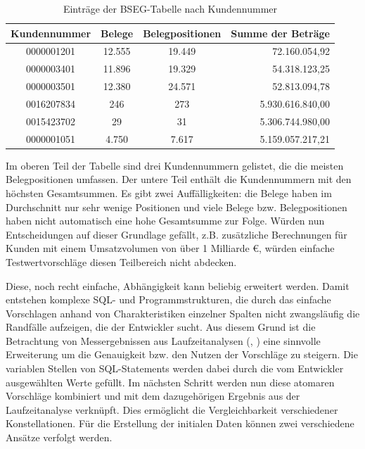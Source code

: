 \begin{table}[ht!]
	\centering
	\begin{tabular}{ |c|c|c|r| }
		\hline
		Kundennummer & Belege & Belegpositionen & Summe der Beträge\\
		\hline
		0000001201 & 12.555 & 19.449 & 72.160.054,92 \\
		0000003401 & 11.896 & 19.329 & 54.318.123,25 \\
		0000003501 & 12.380 & 24.571 & 52.813.094,78 \\
		\hline
		0016207834 & 246 & 273 & 5.930.616.840,00 \\
		0015423702 & 29 & 31 & 5.306.744.980,00 \\
		0000001051 & 4.750 & 7.617 & 5.159.057.217,21 \\
		\hline
	\end{tabular}
	\caption{Einträge der BSEG-Tabelle nach Kundennummer}
	\label{tab:vergleichkonstellationen}
\end{table}

Im oberen Teil der Tabelle sind drei Kundennummern gelistet, die die meisten Belegpositionen umfassen.
Der untere Teil enthält die Kundennummern mit den höchsten Gesamtsummen.
Es gibt zwei Auffälligkeiten: die Belege haben im Durchschnitt nur sehr wenige Positionen und viele Belege bzw. Belegpositionen haben nicht automatisch eine hohe Gesamtsumme zur Folge.
Würden nun Entscheidungen auf dieser Grundlage gefällt, z.B. zusätzliche Berechnungen für Kunden mit einem Umsatzvolumen von über 1 Milliarde \euro{}, würden einfache Testwertvorschläge diesen Teilbereich nicht abdecken.

Diese, noch recht einfache, Abhängigkeit kann beliebig erweitert werden.
Damit entstehen komplexe SQL- und Programmstrukturen, die durch das einfache Vorschlagen anhand von Charakteristiken einzelner Spalten nicht zwangsläufig die Randfälle aufzeigen, die der Entwickler sucht.
Aus diesem Grund ist die Betrachtung von Messergebnissen aus Laufzeitanalysen (\cite{Exner2014}, \cite{Mues2014}) eine sinnvolle Erweiterung um die Genauigkeit bzw. den Nutzen der Vorschläge zu steigern.
Die variablen Stellen von SQL-Statements werden dabei durch die vom Entwickler ausgewählten Werte gefüllt.
Im nächsten Schritt werden nun diese atomaren Vorschläge kombiniert und mit dem dazugehörigen Ergebnis aus der Laufzeitanalyse verknüpft.
Dies ermöglicht die Vergleichbarkeit verschiedener Konstellationen.
Für die Erstellung der initialen Daten können zwei verschiedene Ansätze verfolgt werden.

